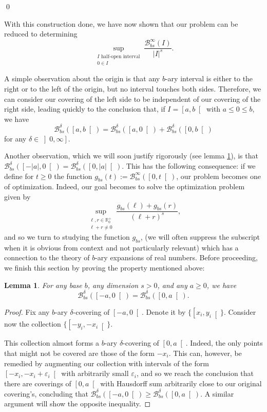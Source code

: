 \documentclass[11pt, reqno]{amsart}
\newcommand{\R}{\mathbb{R}}
\newcommand{\BB}{\mathcal{B}}
\newtheorem{lemma}{Lemma}
\begin{document}
\qed

With this construction done, we have now shown that our problem can be reduced to determining
\[\sup_{\substack{\text{$I$ half-open interval}\\ 0 \in I}} \frac{\BB_{bs}^\infty(I)}{\lvert I \rvert^s}.\]

A simple observation about the origin is that any $b$-ary interval is either to the right or to the left of the origin, but no interval touches both sides. Therefore, we can consider our covering of the left side to be independent of our covering of the right side, leading quickly to the conclusion that, if $I = \left[ a, b \right[$ with $a \leq 0 \leq b$, we have
\[\BB_{bs}^\delta(\left[a, b\right[) = \BB_{bs}^\delta(\left[a, 0\right[) + \BB_{bs}^\delta(\left[0, b\right[)\]
for any $\delta \in \left]0, \infty \right]$.

Another observation, which we will soon justify rigorously (see lemma \ref{sidedoesntmatter}), is that $\BB_{bs}^\delta(\left[-\lvert a\rvert, 0\right[) = \BB_{bs}^\delta(\left[0, \lvert a\rvert\right[)$. This has the following consequence: if we define for $t \geq 0$ the function $g_{bs}(t) := \BB_{bs}^\infty(\left[0, t \right[)$, our problem becomes one of optimization. Indeed, our goal becomes to solve the optimization problem given by
\[ \sup_{\substack{\ell,r \in \R^+_0\\\ell+r \neq 0}} \frac{g_{bs}(\ell) + g_{bs}(r)}{(\ell + r)^s}, \]
and so we turn to studying the function $g_{bs}$, (we will often suppress the subscript when it is obvious from context and not particularly relevant) which has a connection to the theory of $b$-ary expansions of real numbers. Before proceeding, we finish this section by proving the property mentioned above:

\begin{lemma} \label{sidedoesntmatter}
For any base $b$, any dimension $s > 0$, and any $a \geq 0$, we have
\[\BB_{bs}^\delta(\left[-a, 0\right[) = \BB_{bs}^\delta(\left[0, a\right[).\]
\end{lemma}

\begin{proof}
Fix any $b$-ary $\delta$-covering of $\left[-a, 0\right[$. Denote it by $\{\left[x_i, y_i\right[\}$. Consider now the collection $\{\left[-y_i, -x_i\right[\}$. 

This collection almost forms a $b$-ary $\delta$-covering of $\left[0, a\right[$. Indeed, the only points that might not be covered are those of the form $-x_i$. This can, however, be remedied by augmenting our collection with intervals of the form $\left[ -x_i, -x_i + \varepsilon_i \right[$ with arbitrarily small $\varepsilon_i$, and so we reach the conclusion that there are coverings of $\left[0, a\right[$ with Hausdorff sum arbitrarily close to our original covering's, concluding that $\BB_{bs}^\delta(\left[-a, 0\right[) \geq \BB_{bs}^\delta(\left[0, a\right[)$. A similar argument will show the opposite inequality.
\end{proof}
\end{document}
